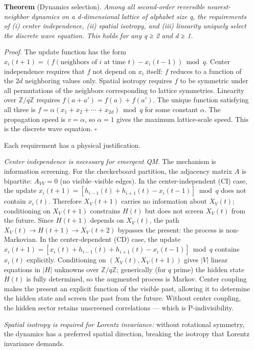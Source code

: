 \documentclass[
]{article}
\begin{document}
\textbf{Theorem} (Dynamics selection). \emph{Among all second-order
reversible nearest-neighbor dynamics on a d-dimensional lattice of
alphabet size q, the requirements of (i) center independence, (ii)
spatial isotropy, and (iii) linearity uniquely select the discrete wave
equation. This holds for any q ≥ 2 and d ≥ 1.}

\emph{Proof.} The update function has the form
\(x_i(t+1) = (f(\text{neighbors of } i \text{ at time } t) - x_i(t-1)) \bmod q\).
Center independence requires that \(f\) not depend on \(x_i\) itself:
\(f\) reduces to a function of the \(2d\) neighboring values only.
Spatial isotropy requires \(f\) to be symmetric under all permutations
of the neighbors corresponding to lattice symmetries. Linearity over
\(\mathbb{Z}/q\mathbb{Z}\) requires \(f(a + a') = f(a) + f(a')\). The
unique function satisfying all three is
\(f = \alpha(x_1 + x_2 + \cdots + x_{2d}) \bmod q\) for some constant
\(\alpha\). The propagation speed is \(v = \alpha\), so \(\alpha = 1\)
gives the maximum lattice-scale speed. This is the discrete wave
equation. \(\square\)

Each requirement has a physical justification.

\emph{Center independence is necessary for emergent QM.} The mechanism
is information screening. For the checkerboard partition, the adjacency
matrix \(A\) is bipartite: \(A_{VV} = 0\) (no visible--visible edges).
In the center-independent (CI) case, the update
\(x_i(t+1) = [h_{i-1}(t) + h_{i+1}(t) - x_i(t-1)] \bmod q\) does not
contain \(x_i(t)\). Therefore \(X_V(t+1)\) carries no information about
\(X_V(t)\); conditioning on \(X_V(t+1)\) constrains \(H(t)\) but does
not screen \(X_V(t)\) from the future. Since \(H(t+1)\) depends on
\(X_V(t)\), the path \(X_V(t) \to H(t+1) \to X_V(t+2)\) bypasses the
present: the process is non-Markovian. In the center-dependent (CD)
case, the update
\(x_i(t+1) = [x_i(t) + h_{i-1}(t) + h_{i+1}(t) - x_i(t-1)] \bmod q\)
contains \(x_i(t)\) explicitly. Conditioning on \((X_V(t), X_V(t+1))\)
gives \(|V|\) linear equations in \(|H|\) unknowns over
\(\mathbb{Z}/q\mathbb{Z}\); generically (for \(q\) prime) the hidden
state \(H(t)\) is fully determined, so the augmented process is Markov.
Center coupling makes the present an explicit function of the visible
past, allowing it to determine the hidden state and screen the past from
the future. Without center coupling, the hidden sector retains
unscreened correlations --- which is P-indivisibility.

\emph{Spatial isotropy is required for Lorentz invariance:} without
rotational symmetry, the dynamics has a preferred spatial direction,
breaking the isotropy that Lorentz invariance demands.
\end{document}
